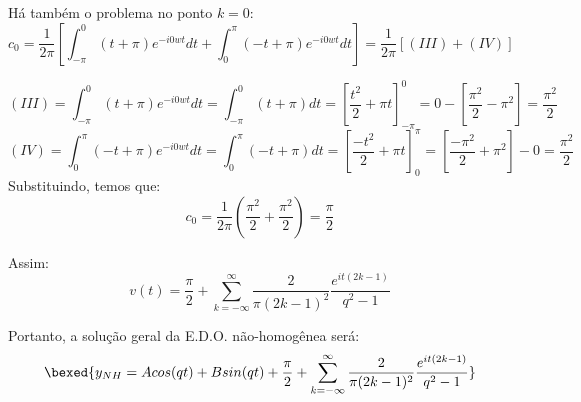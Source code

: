 Há também o problema no ponto $k=0$:
\begin{equation*}
    c_0 =  \frac{1}{2\pi}\left[\int^0_{-\pi} (t+\pi)e^{-i0wt}dt + \int^\pi_0 (-t+\pi)e^{-i0wt}dt \right]= \frac{1}{2\pi}[(III) + (IV)]
\end{equation*}

\begin{equation*}
    (III) = \int^0_{-\pi} (t+\pi)e^{-i0wt}dt = \int^0_{-\pi} (t+\pi)dt = \left[\frac{t^2}{2} + \pi t\right]^0_{-\pi} = 0 - \left[\frac{\pi^2}{2}- \pi^2\right] =\frac{\pi^2}{2}
\end{equation*}
\begin{equation*}
    (IV) = \int^\pi_0 (-t+\pi)e^{-i0wt}dt = \int_0^{\pi} (-t+\pi)dt = \left[\frac{-t^2}{2} + \pi t\right]_0^\pi = \left[\frac{-\pi^2}{2}+ \pi^2\right] - 0 =\frac{\pi^2}{2}
\end{equation*}
Substituindo, temos que:
\begin{equation*}
    c_0 = \frac{1}{2\pi}\left(\frac{\pi^2}{2} + \frac{\pi^2}{2} \right) = \frac{\pi}{2}
\end{equation*}

Assim:
\begin{equation}
    v(t) = \frac{\pi}{2} + \sum^\infty_{k = -\infty} \frac{2}{\pi(2k-1)^2}\frac{e^{it(2k-1)}}{q^2-1} 
\end{equation}

Portanto, a solução geral da E.D.O. não-homogênea será:
\begin{equation*}
    \bexed{y_{NH} = Acos(qt) + Bsin(qt) + \frac{\pi}{2} + \sum^\infty_{k = -\infty} \frac{2}{\pi(2k-1)^2}\frac{e^{it(2k-1)}}{q^2-1}}
\end{equation*}